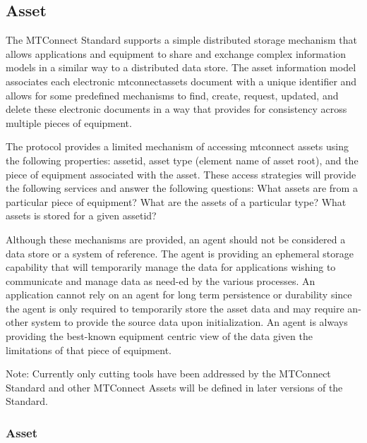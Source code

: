 \subsection{Asset} \label{sec:Asset}

The MTConnect Standard supports a simple distributed storage mechanism that allows applications and equipment to share and exchange complex information models in a similar way to a distributed data store.  The \gls{asset information model} associates each electronic \gls{mtconnectassets} document with a unique identifier and allows for some predefined mechanisms to find, create, request, updated, and delete these electronic documents in a way that provides for consistency across multiple pieces of equipment.

The protocol provides a limited mechanism of accessing \glspl{mtconnect asset} using the following properties: \gls{assetid}, \gls{asset} type (element name of \gls{asset} root), and the piece of equipment associated with the \gls{asset}.  These access strategies will provide the following services and answer the following questions: What \glspl{asset} are from a particular piece of equipment?  What are the \glspl{asset} of a particular type? What \glspl{asset} is stored for a given \gls{assetid}?

Although these mechanisms are provided, an \gls{agent} should not be considered a data store or a system of reference.  The \gls{agent} is providing an ephemeral storage capability that will temporarily manage the data for applications wishing to communicate and manage data as need-ed by the various processes.  An application cannot rely on an \gls{agent} for long term persistence or durability since the \gls{agent} is only required to temporarily store the \gls{asset} data and may require an-other system to provide the source data upon initialization.  An \gls{agent} is always providing the best-known equipment centric view of the data given the limitations of that piece of equipment.

\begin{note}
Note: Currently only cutting tools have been addressed by the MTConnect Standard and other MTConnect Assets will be defined in later versions of the Standard.

\end{note}


\subsubsection{Asset}
  \label{sec:Asset}



